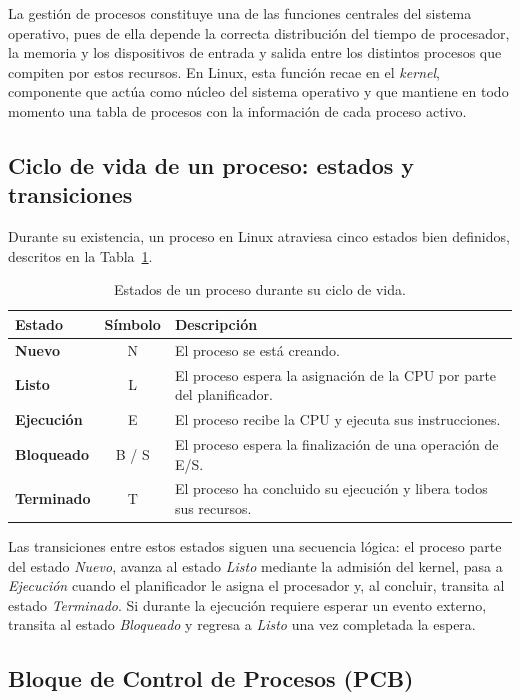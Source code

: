 \documentclass[12pt,a4paper]{article}
\begin{document}
La gestión de procesos constituye una de las funciones centrales del sistema operativo, pues de
ella depende la correcta distribución del tiempo de procesador, la memoria y los dispositivos de
entrada y salida entre los distintos procesos que compiten por estos recursos. En Linux, esta
función recae en el \emph{kernel}, componente que actúa como núcleo del sistema operativo y que
mantiene en todo momento una tabla de procesos con la información de cada proceso activo.

\subsection{Ciclo de vida de un proceso: estados y transiciones}

Durante su existencia, un proceso en Linux atraviesa cinco estados bien definidos, descritos en
la Tabla~\ref{tab:estados}.

\begin{table}[H]
    \centering
    \caption{Estados de un proceso durante su ciclo de vida.}
    \label{tab:estados}
    \begin{tabular}{@{}>{\bfseries}l c p{9cm}@{}}
        \toprule
        Estado      & Símbolo & Descripción \\
        \midrule
        Nuevo       & N & El proceso se está creando. \\
        Listo       & L & El proceso espera la asignación de la CPU por parte del planificador. \\
        Ejecución   & E & El proceso recibe la CPU y ejecuta sus instrucciones. \\
        Bloqueado   & B / S & El proceso espera la finalización de una operación de E/S. \\
        Terminado   & T & El proceso ha concluido su ejecución y libera todos sus recursos. \\
        \bottomrule
    \end{tabular}
\end{table}

Las transiciones entre estos estados siguen una secuencia lógica: el proceso parte del estado
\emph{Nuevo}, avanza al estado \emph{Listo} mediante la admisión del kernel, pasa a
\emph{Ejecución} cuando el planificador le asigna el procesador y, al concluir, transita al
estado \emph{Terminado}. Si durante la ejecución requiere esperar un evento externo, transita
al estado \emph{Bloqueado} y regresa a \emph{Listo} una vez completada la espera.

\subsection{Bloque de Control de Procesos (PCB)}
\end{document}
